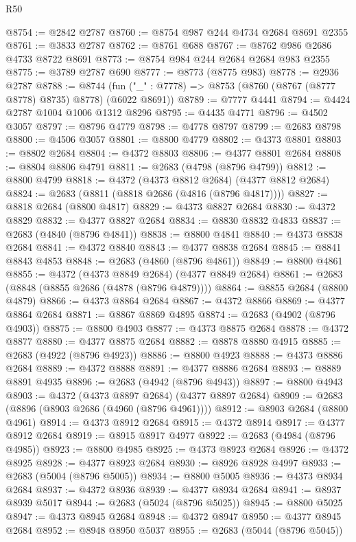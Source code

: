 \begin{lexlean}{R50}
\begin{coremodule}
@8754 := @2842 @2787
@8760 := @8754 @987 @244 @4734 @2684 @8691 @2355
@8761 := @3833 @2787
@8762 := @8761 @688
@8767 := @8762 @986 @2686 @4733 @8722 @8691
@8773 := @8754 @984 @244 @2684 @2684 @983 @2355
@8775 := @3789 @2787 @690
@8777 := @8773 (@8775 @983)
@8778 := @2936 @2787
@8788 := @8744 (fun ("_" : @7778) => @8753 (@8760 (@8767 (@8777 @8778) @8735) @8778) (@6022 @8691))
@8789 := @7777 @4441
@8794 := @4424 @2787 @1004 @1006 @1312 @8296
@8795 := @4435 @4771
@8796 := @4502 @3057
@8797 := @8796 @4779
@8798 := @4778 @8797
@8799 := @2683 @8798
@8800 := @4506 @3057
@8801 := @8800 @4779
@8802 := @4373 @8801
@8803 := @8802 @2684
@8804 := @4372 @8803
@8806 := @4377 @8801 @2684
@8808 := @8804 @8806 @4791
@8811 := @2683 (@4798 (@8796 @4799))
@8812 := @8800 @4799
@8818 := @4372 (@4373 @8812 @2684) (@4377 @8812 @2684)
@8824 := @2683 (@8811 (@8818 @2686 (@4816 (@8796 @4817))))
@8827 := @8818 @2684 (@8800 @4817)
@8829 := @4373 @8827 @2684
@8830 := @4372 @8829
@8832 := @4377 @8827 @2684
@8834 := @8830 @8832 @4833
@8837 := @2683 (@4840 (@8796 @4841))
@8838 := @8800 @4841
@8840 := @4373 @8838 @2684
@8841 := @4372 @8840
@8843 := @4377 @8838 @2684
@8845 := @8841 @8843 @4853
@8848 := @2683 (@4860 (@8796 @4861))
@8849 := @8800 @4861
@8855 := @4372 (@4373 @8849 @2684) (@4377 @8849 @2684)
@8861 := @2683 (@8848 (@8855 @2686 (@4878 (@8796 @4879))))
@8864 := @8855 @2684 (@8800 @4879)
@8866 := @4373 @8864 @2684
@8867 := @4372 @8866
@8869 := @4377 @8864 @2684
@8871 := @8867 @8869 @4895
@8874 := @2683 (@4902 (@8796 @4903))
@8875 := @8800 @4903
@8877 := @4373 @8875 @2684
@8878 := @4372 @8877
@8880 := @4377 @8875 @2684
@8882 := @8878 @8880 @4915
@8885 := @2683 (@4922 (@8796 @4923))
@8886 := @8800 @4923
@8888 := @4373 @8886 @2684
@8889 := @4372 @8888
@8891 := @4377 @8886 @2684
@8893 := @8889 @8891 @4935
@8896 := @2683 (@4942 (@8796 @4943))
@8897 := @8800 @4943
@8903 := @4372 (@4373 @8897 @2684) (@4377 @8897 @2684)
@8909 := @2683 (@8896 (@8903 @2686 (@4960 (@8796 @4961))))
@8912 := @8903 @2684 (@8800 @4961)
@8914 := @4373 @8912 @2684
@8915 := @4372 @8914
@8917 := @4377 @8912 @2684
@8919 := @8915 @8917 @4977
@8922 := @2683 (@4984 (@8796 @4985))
@8923 := @8800 @4985
@8925 := @4373 @8923 @2684
@8926 := @4372 @8925
@8928 := @4377 @8923 @2684
@8930 := @8926 @8928 @4997
@8933 := @2683 (@5004 (@8796 @5005))
@8934 := @8800 @5005
@8936 := @4373 @8934 @2684
@8937 := @4372 @8936
@8939 := @4377 @8934 @2684
@8941 := @8937 @8939 @5017
@8944 := @2683 (@5024 (@8796 @5025))
@8945 := @8800 @5025
@8947 := @4373 @8945 @2684
@8948 := @4372 @8947
@8950 := @4377 @8945 @2684
@8952 := @8948 @8950 @5037
@8955 := @2683 (@5044 (@8796 @5045))

\end{coremodule}
\end{lexlean}
